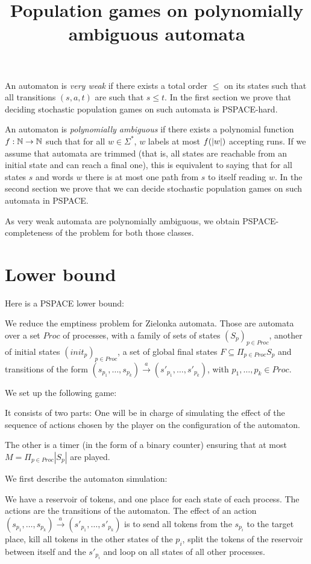 \documentclass{article}
\title{Population games on polynomially ambiguous automata}
\author{}
\date{}
\begin{document}
\maketitle

An automaton is \emph{very weak} if there exists a total order $\leq$ on its states such that all transitions $(s, a, t)$ are such that $s \leq t$.
In the first section we prove that deciding stochastic population games on such automata is PSPACE-hard.

An automaton is \emph{polynomially ambiguous} if there exists a polynomial function $f : \mathbb{N} \to \mathbb{N}$ such that for all $w \in \Sigma^*$, $w$ labels at most $f(|w|)$ accepting runs. 
If we assume that automata are trimmed (that is, all states are reachable from an initial state and can reach a final one), this is equivalent to saying that for all states $s$ and words $w$ there is at most one path from $s$ to itself reading $w$.
In the second section we prove that we can decide stochastic population games on such automata in PSPACE.

As very weak automata are polynomially ambiguous, we obtain PSPACE-completeness of the problem for both those classes.

\section{Lower bound}

Here is a PSPACE lower bound: 

We reduce the emptiness problem for Zielonka automata. Those are automata over a set $Proc$ of processes, with a family of sets of states $(S_p)_{p \in Proc}$, another of initial states $(init_p)_{p \in Proc}$, a set of global final states $F \subseteq \Pi_{p\in Proc} S_p$ and transitions of the form $(s_{p_1}, \ldots, s_{p_k}) \xrightarrow{a} (s'_{p_1}, \ldots, s'_{p_k})$, with $p_1, \ldots, p_k \in Proc$.

We set up the following game: 

It consists of two parts: One will be in charge of simulating the effect of the sequence of actions chosen by the player on the configuration of the automaton.

The other is a timer (in the form of a binary counter) ensuring that at most  $M = \Pi_{p\in Proc} |S_p|$ are played.

We first describe the automaton simulation: 

We have a reservoir of tokens, and one place for each state of each process.
The actions are the transitions of the automaton. The effect of an action $(s_{p_1}, \ldots, s_{p_k}) \xrightarrow{a} (s'_{p_1}, \ldots, s'_{p_k})$ is to send all tokens from the $s_{p_i}$ to the target place, kill all tokens in the other states of the $p_i$, split the tokens of the reservoir between itself and the $s'_{p_i}$ and loop on all states of all other processes.
\end{document}
